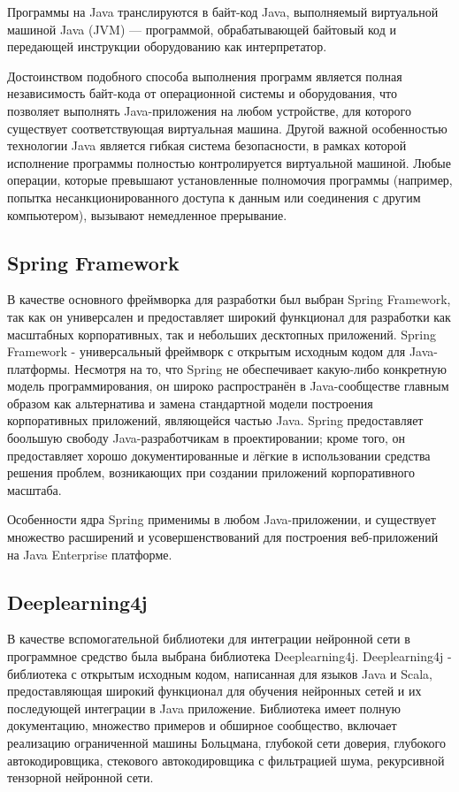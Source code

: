 Программы на Java транслируются в байт-код Java, выполняемый виртуальной машиной Java (JVM) — программой, обрабатывающей байтовый код и передающей инструкции оборудованию как интерпретатор.

Достоинством подобного способа выполнения программ является полная независимость байт-кода от операционной системы и оборудования, что позволяет выполнять Java-приложения на любом устройстве, для которого существует соответствующая виртуальная машина.
Другой важной особенностью технологии Java является гибкая система безопасности, в рамках которой исполнение программы полностью контролируется виртуальной машиной.
Любые операции, которые превышают установленные полномочия программы (например, попытка несанкционированного доступа к данным или соединения с другим компьютером), вызывают немедленное прерывание.

\subsection{Spring Framework}

В качестве основного фреймворка для разработки был выбран Spring Framework, так как он универсален и предоставляет широкий функционал для разработки как масштабных корпоративных, так и небольших десктопных приложений.
Spring Framework - универсальный фреймворк с открытым исходным кодом для Java-платформы.
Несмотря на то, что Spring не обеспечивает какую-либо конкретную модель программирования, он широко распространён в Java-сообществе главным образом как альтернатива и замена стандартной модели построения корпоративных приложений, являющейся частью Java.
Spring предоставляет боольшую свободу Java-разработчикам в проектировании; кроме того, он предоставляет хорошо документированные и лёгкие в использовании средства решения проблем, возникающих при создании приложений корпоративного масштаба.

Особенности ядра Spring применимы в любом Java-приложении, и существует множество расширений и усовершенствований для построения веб-приложений на Java Enterprise платформе.

\subsection{Deeplearning4j}

В качестве вспомогательной библиотеки для интеграции нейронной сети в программное средство была выбрана библиотека Deeplearning4j.
Deeplearning4j - библиотека с открытым исходным кодом, написанная для языков Java и Scala, предоставляющая широкий функционал для обучения нейронных сетей и их последующей интеграции в Java приложение.
Библиотека имеет полную документацию, множество примеров и обширное сообщество, включает реализацию ограниченной машины Больцмана, глубокой сети доверия, глубокого автокодировщика, стекового автокодировщика с фильтрацией шума, рекурсивной тензорной нейронной сети.

\clearpage